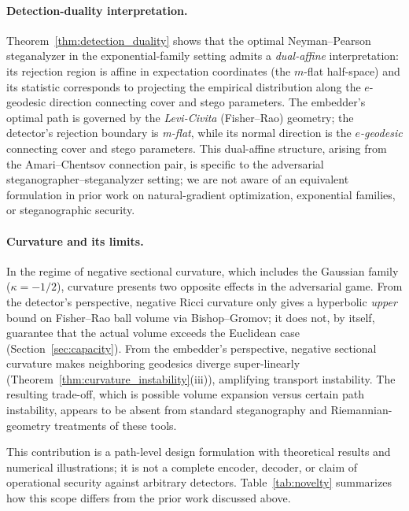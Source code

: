 \documentclass[a4paper,fleqn]{cas-dc}
\begin{document}
\paragraph{Detection-duality interpretation.}
Theorem~\ref{thm:detection_duality} shows that the optimal Neyman--Pearson
steganalyzer in the exponential-family setting admits a \emph{dual-affine}
interpretation: its rejection region is affine in expectation coordinates (the
$m$-flat half-space) and its statistic corresponds to projecting the empirical
distribution along the $e$-geodesic direction connecting cover and stego
parameters.
The embedder's optimal path is governed by the \emph{Levi-Civita}
(Fisher--Rao) geometry; the detector's rejection boundary is \emph{m-flat},
while its normal direction is the \emph{$e$-geodesic} connecting cover and
stego parameters.  This dual-affine structure, arising from the
Amari--Chentsov connection pair, is specific to the adversarial
steganographer--steganalyzer setting; we are not aware of an equivalent
formulation in prior work on natural-gradient optimization, exponential
families, or steganographic security.

\paragraph{Curvature and its limits.}
In the regime of negative sectional curvature, which includes the Gaussian
family ($\kappa = -1/2$), curvature presents two opposite effects in the
adversarial game.  From the detector's perspective, negative Ricci curvature
only gives a hyperbolic \emph{upper} bound on Fisher--Rao ball volume via
Bishop--Gromov; it does not, by itself, guarantee that the actual volume
exceeds the Euclidean case (Section~\ref{sec:capacity}).  From the embedder's
perspective, negative sectional curvature makes neighboring geodesics diverge
super-linearly (Theorem~\ref{thm:curvature_instability}(iii)), amplifying
transport instability.  The resulting trade-off, which is possible volume expansion
versus certain path instability, appears to be absent from standard
steganography and Riemannian-geometry treatments of these tools.

This contribution is a path-level design formulation with theoretical
results and numerical illustrations; it is not a complete encoder, decoder,
or claim of operational security against arbitrary detectors. Table~\ref{tab:novelty}
summarizes how this scope differs from the prior work discussed above.
\end{document}
